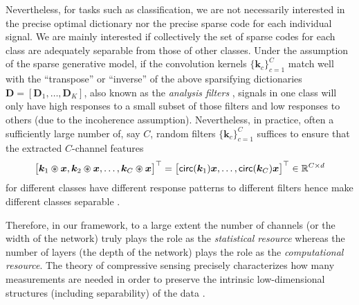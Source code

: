 \documentclass[\toplevelprefix/book-main.tex]{subfiles}
\begin{document}
Nevertheless, for tasks such as classification, we are not necessarily interested in the precise optimal dictionary nor the precise sparse code for each individual signal. We are mainly interested if collectively the set of sparse codes for each class are adequately separable from those of other classes. Under the assumption of the sparse generative model, if the convolution kernels $\{\bm k_c\}_{c=1}^C$  match well with the ``transpose'' or ``inverse'' of the above sparsifying dictionaries $\bm D = [\bm D_1, \ldots, \bm D_K]$, also known as the {\em analysis filters} \cite{Cosparse-Nam,Analysis-Filter}, signals in one class will only have high responses to a small subset of those filters and low responses to others (due to the incoherence assumption).  Nevertheless, in practice, often a sufficiently large number of, say $C$, random filters $\{\bm k_c\}_{c=1}^C$ suffices to ensure that the extracted $C$-channel features
\begin{equation}
\big[\bm k_1 \circledast \bm{x}, \bm k_2 \circledast \bm{x}, \ldots, \bm k_C \circledast \bm{x}\big]^\top = \big[\mathsf{circ}(\bm k_1) \bm{x}, \ldots, \mathsf{circ}(\bm k_C) \bm{x} \big]^\top \in \mathbb{R}^{C\times d}
\end{equation}
for different classes have different response patterns to different filters hence make different classes separable \cite{chan2015pcanet}. 

Therefore, in our framework, to a large extent the number of channels (or the width of the network) truly plays the role as the  {\em statistical resource} whereas the number of layers (the depth of the network) plays the role as the {\em computational resource}. The theory of compressive sensing precisely characterizes how many measurements are needed in order to preserve the intrinsic low-dimensional structures (including separability) of the data \cite{Wright-Ma-2021}. %
\end{document}
